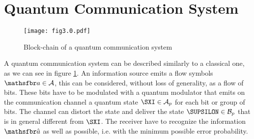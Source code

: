 \section{Quantum Communication System}
    \begin{figure}[t]
        \begin{center}
            \texttt{[image: fig3.0.pdf]}
            \caption{Block-chain of a quantum communication system}
            \label{fig:3.0}
        \end{center}
    \end{figure}
    A quantum communication system can be described similarly to a classical one, as we can 
    see in figure \ref{fig:3.0}. An information source emits a flow symbols $\msf{a} \in \mathcal{A}$, this
    can be considered, without loss of generality, as a flow of bits. These bits have to be 
    modulated with a quantum modulator that emits on the communication channel a quantum state
    $\Operator{\sXi} \in \mathcal{A}_p$ for each bit or group of bits. The channel can distort the
    state and deliver the state $\Operator{\sUpsilon} \in \mathcal{B}_p$ that is in general 
    different from $\Operator{\sXi}$.
    The receiver have to recognize the information $\msf{\hat{a}}$ as well as possible, i.e. with 
    the minimum possible error probability.

